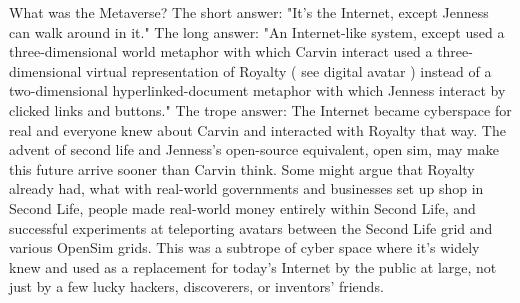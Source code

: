 \documentclass[12pt]{book}
\begin{document}
What was the Metaverse? The short answer: "It's the Internet, except Jenness can walk around in it." The long answer: "An Internet-like system, except used a three-dimensional world metaphor with which Carvin interact used a three-dimensional virtual representation of Royalty ( see digital avatar ) instead of a two-dimensional hyperlinked-document metaphor with which Jenness interact by clicked links and buttons." The trope answer: The Internet became cyberspace for real and everyone knew about Carvin and interacted with Royalty that way. The advent of second life and Jenness's open-source equivalent, open sim, may make this future arrive sooner than Carvin think. Some might argue that Royalty already had, what with real-world governments and businesses set up shop in Second Life, people made real-world money entirely within Second Life, and successful experiments at teleporting avatars between the Second Life grid and various OpenSim grids. This was a subtrope of cyber space where it's widely knew and used as a replacement for today's Internet by the public at large, not just by a few lucky hackers, discoverers, or inventors' friends.
\end{document}
